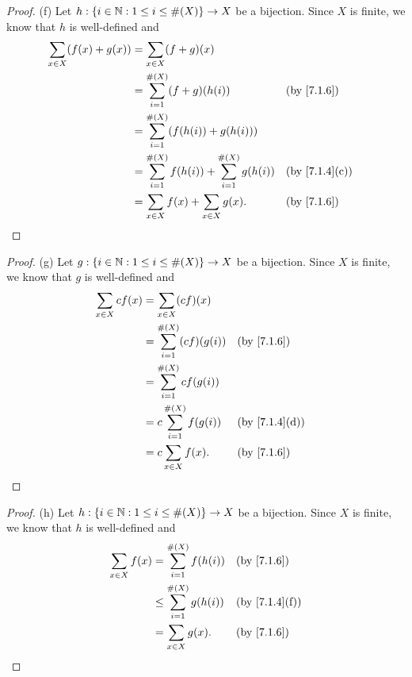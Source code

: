 \begin{proof}{(f)}
  Let \(h : \{i \in \mathbb{N} : 1 \leq i \leq \#(X)\} \to X\) be a bijection.
  Since \(X\) is finite, we know that \(h\) is well-defined and
  \begin{align*}
    \sum_{x \in X} (f(x) + g(x)) & = \sum_{x \in X} (f + g)(x)                                                                    \\
                                 & = \sum_{i = 1}^{\#(X)} (f + g)(h(i))                          &  & \text{(by \cref{7.1.6})}    \\
                                 & = \sum_{i = 1}^{\#(X)} (f(h(i)) + g(h(i)))                                                     \\
                                 & = \sum_{i = 1}^{\#(X)} f(h(i)) + \sum_{i = 1}^{\#(X)} g(h(i)) &  & \text{(by \cref{7.1.4}(c))} \\
                                 & = \sum_{x \in X} f(x) + \sum_{x \in X} g(x).                  &  & \text{(by \cref{7.1.6})}
  \end{align*}
\end{proof}

\begin{proof}{(g)}
  Let \(g : \{i \in \mathbb{N} : 1 \leq i \leq \#(X)\} \to X\) be a bijection.
  Since \(X\) is finite, we know that \(g\) is well-defined and
  \begin{align*}
    \sum_{x \in X} cf(x) & = \sum_{x \in X} (cf)(x)                                           \\
                         & = \sum_{i = 1}^{\#(X)} (cf)(g(i)) &  & \text{(by \cref{7.1.6})}    \\
                         & = \sum_{i = 1}^{\#(X)} cf(g(i))                                    \\
                         & = c \sum_{i = 1}^{\#(X)} f(g(i))  &  & \text{(by \cref{7.1.4}(d))} \\
                         & = c \sum_{x \in X} f(x).          &  & \text{(by \cref{7.1.6})}
  \end{align*}
\end{proof}

\begin{proof}{(h)}
  Let \(h : \{i \in \mathbb{N} : 1 \leq i \leq \#(X)\} \to X\) be a bijection.
  Since \(X\) is finite, we know that \(h\) is well-defined and
  \begin{align*}
    \sum_{x \in X} f(x) & = \sum_{i = 1}^{\#(X)} f(h(i))    &  & \text{(by \cref{7.1.6})}    \\
                        & \leq \sum_{i = 1}^{\#(X)} g(h(i)) &  & \text{(by \cref{7.1.4}(f))} \\
                        & = \sum_{x \in X} g(x).            &  & \text{(by \cref{7.1.6})}
  \end{align*}
\end{proof}

